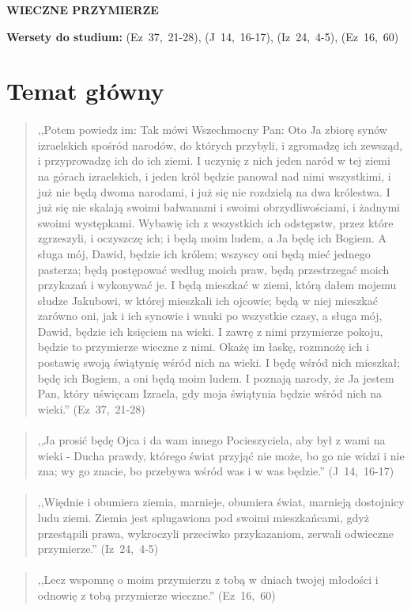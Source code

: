 \documentclass[10pt,a4paper,oneside]{article}
\begin{document}
\centerline{\textbf{\MakeUppercase{Wieczne przymierze}}}
\begin{center}
\textbf{Wersety do studium:} \mbox{(Ez 37, 21-28)}, \mbox{(J 14, 16-17)}, \mbox{(Iz 24, 4-5)}, \mbox{(Ez 16, 60)}
\end{center}
\section{Temat główny}
\paragraph{}
\begin{quote}
,,Potem powiedz im: Tak mówi Wszechmocny Pan: Oto Ja zbiorę synów izraelskich spośród narodów, do których przybyli, i zgromadzę ich zewsząd, i przyprowadzę ich do ich ziemi. I uczynię z nich jeden naród w tej ziemi na górach izraelskich, i jeden król będzie panował nad nimi wszystkimi, i już nie będą dwoma narodami, i już się nie rozdzielą na dwa królestwa. I już się nie skalają swoimi bałwanami i swoimi obrzydliwościami, i żadnymi swoimi występkami. Wybawię ich z wszystkich ich odstępstw, przez które zgrzeszyli, i oczyszczę ich; i będą moim ludem, a Ja będę ich Bogiem. A sługa mój, Dawid, będzie ich królem; wszyscy oni będą mieć jednego pasterza; będą postępować według moich praw, będą przestrzegać moich przykazań i wykonywać je. I będą mieszkać w ziemi, którą dałem mojemu słudze Jakubowi, w której mieszkali ich ojcowie; będą w niej mieszkać zarówno oni, jak i ich synowie i wnuki po wszystkie czasy, a sługa mój, Dawid, będzie ich księciem na wieki. I zawrę z nimi przymierze pokoju, będzie to przymierze wieczne z nimi. Okażę im łaskę, rozmnożę ich i postawię swoją świątynię wśród nich na wieki. I będę wśród nich mieszkał; będę ich Bogiem, a oni będą moim ludem. I poznają narody, że Ja jestem Pan, który uświęcam Izraela, gdy moja świątynia będzie wśród nich na wieki.'' \mbox{(Ez 37, 21-28)}
\end{quote}
\paragraph{}
\begin{quote}
,,Ja prosić będę Ojca i da wam innego Pocieszyciela, aby był z wami na wieki - Ducha prawdy, którego świat przyjąć nie może, bo go nie widzi i nie zna; wy go znacie, bo przebywa wśród was i w was będzie.'' \mbox{(J 14, 16-17)}
\end{quote}
\paragraph{}
\begin{quote}
,,Więdnie i obumiera ziemia, marnieje, obumiera świat, marnieją dostojnicy ludu ziemi. Ziemia jest splugawiona pod swoimi mieszkańcami, gdyż przestąpili prawa, wykroczyli przeciwko przykazaniom, zerwali odwieczne przymierze.'' \mbox{(Iz 24, 4-5)}
\end{quote}
\paragraph{}
\begin{quote}
,,Lecz wspomnę o moim przymierzu z tobą w dniach twojej młodości i odnowię z tobą przymierze wieczne.'' \mbox{(Ez 16, 60)}
\end{quote}
\end{document}
